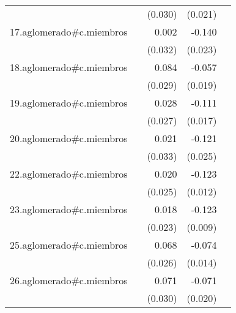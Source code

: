 {\begin{longtable}{l*{4}{D{.}{.}{-1}}}
            &                     &     (0.030)         &     (0.021)         &                     \\
\addlinespace
17.aglomerado#c.miembros&                     &       0.002         &      -0.140\sym{***}&                     \\
            &                     &     (0.032)         &     (0.023)         &                     \\
\addlinespace
18.aglomerado#c.miembros&                     &       0.084\sym{**} &      -0.057\sym{**} &                     \\
            &                     &     (0.029)         &     (0.019)         &                     \\
\addlinespace
19.aglomerado#c.miembros&                     &       0.028         &      -0.111\sym{***}&                     \\
            &                     &     (0.027)         &     (0.017)         &                     \\
\addlinespace
20.aglomerado#c.miembros&                     &       0.021         &      -0.121\sym{***}&                     \\
            &                     &     (0.033)         &     (0.025)         &                     \\
\addlinespace
22.aglomerado#c.miembros&                     &       0.020         &      -0.123\sym{***}&                     \\
            &                     &     (0.025)         &     (0.012)         &                     \\
\addlinespace
23.aglomerado#c.miembros&                     &       0.018         &      -0.123\sym{***}&                     \\
            &                     &     (0.023)         &     (0.009)         &                     \\
\addlinespace
25.aglomerado#c.miembros&                     &       0.068\sym{**} &      -0.074\sym{***}&                     \\
            &                     &     (0.026)         &     (0.014)         &                     \\
\addlinespace
26.aglomerado#c.miembros&                     &       0.071\sym{*}  &      -0.071\sym{***}&                     \\
            &                     &     (0.030)         &     (0.020)         &                     \\

\end{longtable}}
